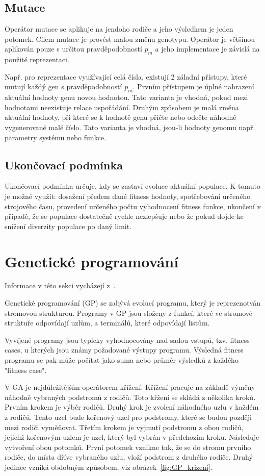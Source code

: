 \subsection{Mutace}
Operátor mutace se aplikuje na jendoho rodiče a jeho výsledkem je jeden potomek.
Cílem mutace je provést malou změnu genotypu.
Operátor je většinou aplikován pouze s určitou pravděpodobností $p_m$ a jeho implementace je závislá na použité reprezentaci.


Např. pro reprezentace využívající celá čísla, existují 2 záladní přístupy, které mutují každý gen s pravděpodobností $p_m$.
Prvním přístupem je úplné nahrazení aktuální hodnoty genu novou hodnotou.
Tato varianta je vhodná, pokud mezi hodnotami neexistuje relace uspořádání.
Druhým způsobem je malá změna aktuální hodnoty, při které se k hodnotě genu přičte nebo odečte náhodně vygenerované malé číslo.
Tato varianta je vhodná, jsou-li hodnoty genomu např. parametry systému nebo funkce.

\subsection{Ukončovací podmínka}
Ukončovací podmínka určuje, kdy se zastaví evoluce aktuální populace.
K tomuto je možné využít: dosažení předem dané fitness hodnoty, spotřebování určeného strojového času, provedení určeného počtu vyhodnocení fitness funkce, ukončení v případě, že se populace dostatečně rychle nezlepšuje nebo že pokud dojde ke snížení diverzity populace po daný limit.

\section{Genetické programování}
\label{sec:gp}

Informace v této sekci vycházejí z~\cite{Koza1992}.

Genetické programování (GP) se zabývá evolucí programu, který je reprezenotván stromovou strukturou.
Programy v GP jsou složeny z funkcí, které ve stromové struktuře odpovídají uzlům, a terminálů, které odpovídají listům.

Vyvíjené programy jsou typicky vyhodnocovány nad sadou vstupů, tzv. fitness cases, u kterých jsou známy požadované výstupy programu.
Výsledná fitness programu se pak může počítat jako suma nebo průměr výsledků z každého "fitness case".

V GA je nejdůležitějším operátorem křížení.
Křížení pracuje na základě výměny náhodně vybraných podstromů z rodičů.
Toto křžení se skládá z několika kroků.
Prvním krokem je výběr rodičů.
Druhý krok je zvolení náhodného uzlu v každém z rodičů.
Tento uzel bude kořenový uzel pro podstromy, které se budou později mezi rodiči vyměňovat.
Třetím krokem je vyjmutí podstromu z obou rodičů, jejichž kořenovým uzlem je uzel, který byl vybrán v předchozím kroku.
Následuje vytvoření obou potomků.
První potomek vznikne tak, že se do stromu prvního rodiče, do místa dříve vybraného uzlu, vloží podstrom z druhého rodiče.
Druhý jedinec vzniká obdobným způsobem, viz obrázek~\ref{fig:GP_krizeni}.

